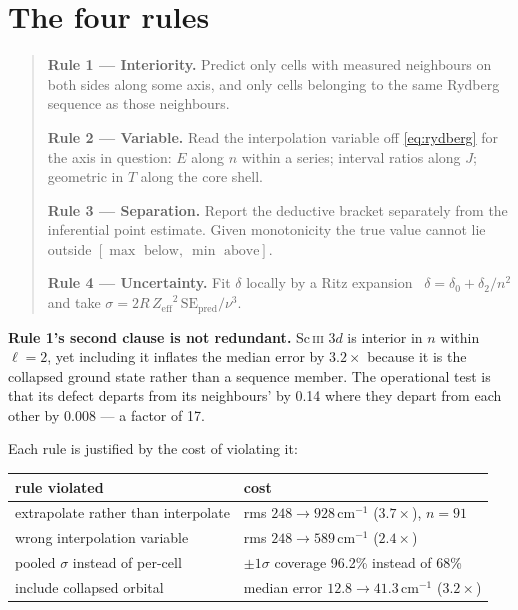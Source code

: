 \documentclass[11pt,a4paper]{article}
\theoremstyle{definition}
\newcommand{\Zeff}{\ensuremath{Z_{\mathrm{eff}}}}
\newcommand{\cmi}{\,\ensuremath{\mathrm{cm}^{-1}}}
\begin{document}
\section{The four rules}
\begin{quote}\small
\textbf{Rule 1 --- Interiority.} Predict only cells with measured neighbours on
both sides along some axis, and only cells belonging to the same Rydberg
sequence as those neighbours.

\textbf{Rule 2 --- Variable.} Read the interpolation variable off
\eqref{eq:rydberg} for the axis in question: $E$ along $n$ within a series;
interval ratios along $J$; geometric in $T$ along the core shell.

\textbf{Rule 3 --- Separation.} Report the deductive bracket separately from the
inferential point estimate. Given monotonicity the true value cannot lie outside
$[\max\text{ below},\ \min\text{ above}]$.

\textbf{Rule 4 --- Uncertainty.} Fit $\delta$ locally by a Ritz
expansion~\cite{ritz} $\delta=\delta_{0}+\delta_{2}/n^{2}$ and take
$\sigma = 2R\,\Zeff^{2}\,\mathrm{SE}_{\mathrm{pred}}/\nu^{3}$.
\end{quote}

\textbf{Rule 1's second clause is not redundant.} Sc\,\textsc{iii} $3d$ is
interior in $n$ within $\ell=2$, yet including it inflates the median error by
$3.2\times$ because it is the collapsed ground state rather than a sequence
member. The operational test is that its defect departs from its neighbours' by
0.14 where they depart from each other by 0.008 --- a factor of 17.

Each rule is justified by the cost of violating it:

\begin{center}\small
\begin{tabular}{@{}ll@{}}
\toprule
rule violated & cost\\
\midrule
extrapolate rather than interpolate & rms $248\to928$\cmi{} ($3.7\times$), $n=91$\\
wrong interpolation variable        & rms $248\to589$\cmi{} ($2.4\times$)\\
pooled $\sigma$ instead of per-cell & $\pm1\sigma$ coverage 96.2\% instead of 68\%\\
include collapsed orbital           & median error $12.8\to41.3$\cmi{} ($3.2\times$)\\
\bottomrule
\end{tabular}
\end{center}
\end{document}
